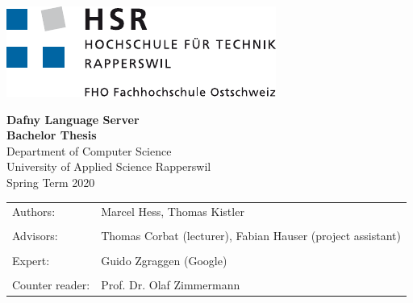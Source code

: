 \begin{titlepage}
\thispagestyle{empty}

\newcommand\thesisAuthors{Marcel Hess, Thomas Kistler}
\newcommand\thesisTitle{Dafny Language Server}
\newcommand\thesisSubject{Bachelor Thesis}
\newcommand\thesisUniversity{University of Applied Science Rapperswil}
\newcommand\thesisDepartment{Department of Computer Science}
\newcommand\thesisAdvisors{Thomas Corbat (lecturer), Fabian Hauser (project assistant)}
\newcommand\thesisExpert{Guido Zgraggen (Google)}
\newcommand\thesisPeriod{Spring Term 2020}
\newcommand\thesisReader{Prof. Dr. Olaf Zimmermann}

    \includegraphics[height=0.08\textheight]{images/logo_hsr.pdf}\\[40mm]

    \begin{center}

    	\Huge
    	\textbf{\thesisTitle} \\
    	\textbf{\thesisSubject} \\[20mm]

    	\LARGE
    	\thesisDepartment\\
    	\thesisUniversity\\[10mm]

    	\thesisPeriod \\[15mm]

    	\vfill

    \end{center}

\begin{tabularx}{\textwidth}{l X}
			\large Authors: & \large{ \thesisAuthors} \tabularnewline
			\tabularnewline
			\large Advisors: & \large{\thesisAdvisors} \tabularnewline
			\tabularnewline
			\large Expert: & \large \thesisExpert \tabularnewline
			\tabularnewline
			\large Counter reader: & \large \thesisReader
		\end{tabularx}

\end{titlepage}
